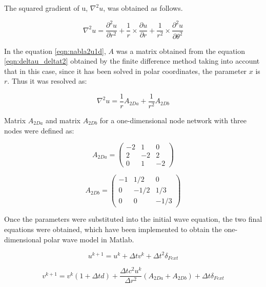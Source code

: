 \documentclass[12pt, a4paper]{article} %
\begin{document}
The squared gradient of u, $\nabla^{2}u$, was obtained as follows.

\begin{equation} \label{eqn:nabla2u1d}
	\nabla^{2}u = \frac{\partial^{2}u}{\partial r^{2}} + \frac{1}{r} \times \frac{\partial u}{\partial r} + \frac{1}{r^{2}} \times \frac{\partial ^{2} u}{\partial \theta^{2}}
\end{equation}

In the equation \ref{eqn:nabla2u1d}, $A$ was a matrix obtained from the equation \ref{eqn:deltau_deltat2} obtained by the finite difference method taking into account that in this case, since it has been solved in polar coordinates, the parameter $x$ is $r$. Thus it was resolved as:

\begin{equation} \label{eqn:nabla2u1d_2}
	\nabla^{2}u = \frac{1}{r} A_{2Da} + \frac{1}{r^{2}} A_{2Db}
\end{equation}

Matrix $A_{2Da}$ and matrix $A_{2Db}$ for a one-dimensional node network with three nodes were defined as:

\begin{equation} \label{eqn:matrixA_2Da}
	A_{2Da} = 
	\begin{pmatrix}
		-2 & 1 & 0\\
		2 & -2 & 2\\
		0 & 1 & -2
	\end{pmatrix}
\end{equation}

\begin{equation} \label{eqn:matrixA_2Db}
	A_{2Db} = 
	\begin{pmatrix}
		-1 & 1/2 & 0\\
		0 & -1/2 & 1/3\\
		0 & 0 & -1/3
	\end{pmatrix}
\end{equation}

Once the parameters were substituted into the initial wave equation, the two final equations were obtained, which have been implemented to obtain the one-dimensional polar wave model in Matlab.

\begin{equation} \label{eqn:uk+1}
	u^{k + 1} = u^{k} + \Delta t v^{k} + \Delta t^{2} \delta_{Fext}
\end{equation}

\begin{equation} \label{eqn:vk+1}
	v^{k + 1} = v^{k}(1 + \Delta t d) + \frac{\Delta t c^{2} u^{k}}{\Delta r^{2}} (A_{2Da} + A_{2Db}) +  \Delta t \delta_{Fext}
\end{equation}
\end{document}
